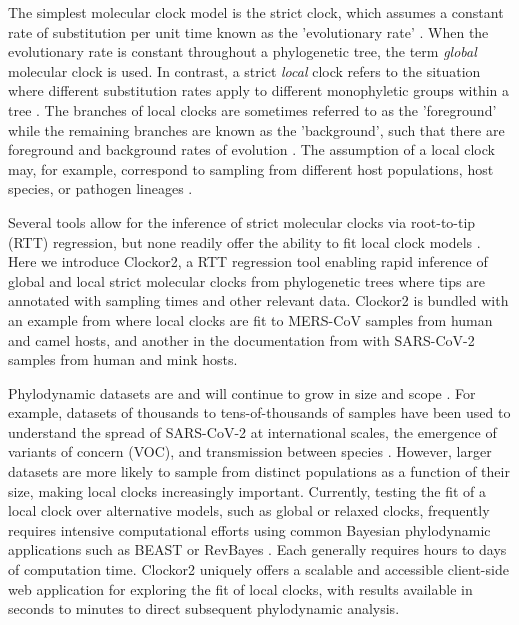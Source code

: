 \documentclass{article}
\begin{document}
The simplest molecular clock model is the strict clock, which assumes a constant rate of substitution per unit time known as the 'evolutionary rate' \citep{zuckerkandl_evolutionary_1965}. When the evolutionary rate is constant throughout a phylogenetic tree, the term \emph{global} molecular clock is used. In contrast, a strict \emph{local} clock refers to the situation where different substitution rates apply to different monophyletic groups within a tree \citep{ho2014molecular}. The branches of local clocks are sometimes referred to as the 'foreground' while the remaining branches are known as the 'background', such that there are foreground and background rates of evolution \citep{yoder2000estimation}. The assumption of a local clock may, for example, correspond to  sampling from different host populations, host species, or pathogen lineages \citep{worobey_synchronized_2014}. 

Several tools allow for the inference of strict molecular clocks via root-to-tip (RTT) regression, but none readily offer the ability to fit local clock models \citep{rambaut_exploring_2016, hadfield_nextstrain_2018,sagulenko_treetime_2018,volz_scalable_2017}. Here we introduce Clockor2, a RTT regression tool enabling rapid inference of global and local strict molecular clocks from phylogenetic trees where tips are annotated with sampling times and other relevant data. Clockor2 is bundled with an example from \citet{dudas_mers-cov_2018} where local clocks are fit to MERS-CoV samples from human and camel hosts, and another in the documentation from \citet{porter2023evolutionary} with SARS-CoV-2 samples from human and mink hosts.

Phylodynamic datasets are and will continue to grow in size and scope \citep{featherstone2022epidemiological}. For example, datasets of thousands to tens-of-thousands of samples have been used to understand the spread of SARS-CoV-2 at international scales, the emergence of variants of concern (VOC), and transmission between species \citep{du_plessis_establishment_2021,hill_origins_2022,nadeau_swiss_2023,porter2023evolutionary}. However, larger datasets are more likely to sample from distinct populations as a function of their size, making local clocks increasingly important. Currently, testing the fit of a local clock over alternative models, such as global or relaxed clocks, frequently requires intensive computational efforts using common Bayesian phylodynamic applications such as BEAST or RevBayes \citep{bouckaert_beast_2019, suchard_bayesian_2018, hoehna_2016_revbayes, drummond2007beast, drummond2012bayesian}. Each generally requires hours to days of computation time. Clockor2 uniquely offers a scalable and accessible client-side web application for exploring the fit of local clocks, with results available in seconds to minutes to direct subsequent phylodynamic analysis.
\end{document}
